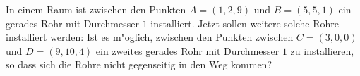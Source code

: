 In einem Raum ist zwischen den Punkten $A=(1,2,9)$ und $B=(5,5,1)$
ein gerades Rohr mit Durchmesser $1$ installiert.
Jetzt sollen weitere solche Rohre installiert werden:
Ist es m"oglich, zwischen den Punkten zwischen $C=(3,0,0)$ und $D=(9,10,4)$
ein zweites gerades Rohr mit Durchmesser $1$ zu installieren, so dass sich
die Rohre nicht gegenseitig in den Weg kommen?

